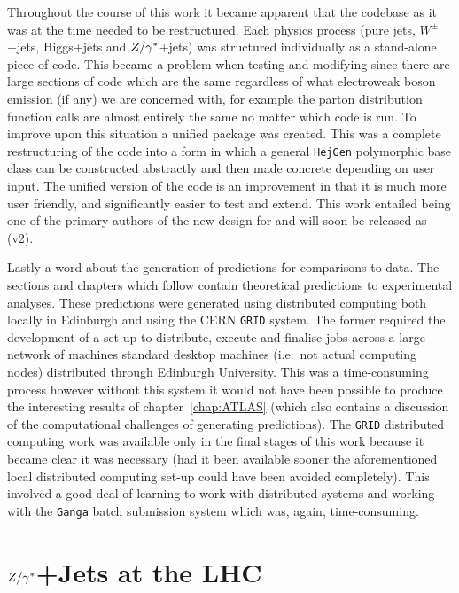 	Throughout the course of this work it became apparent that the \hej
	codebase as it was at the time needed to be restructured.  Each physics
	process (pure jets, $W^\pm$+jets, Higgs+jets and $Z/\gamma^*$+jets) was structured
	individually as a stand-alone piece of code.  This became a problem when testing
	and modifying \HEJ since there are large sections of code which are the same
	regardless of what electroweak boson emission (if any) we are concerned with,
	for example the parton distribution function calls are almost entirely the same
	no matter which code is run.  To improve upon this situation a unified \HEJ
	package was created.  This was a complete restructuring of the code into a form
	in which a general \texttt{HejGen} polymorphic base class can be
	constructed abstractly and then made concrete depending on user input.
	The unified version of the code is an improvement in that it is much more user
	friendly, and significantly easier to test and extend.  This work entailed
	being one of the primary authors of the new design for \hej and will soon be
	released as \HEJ (v2).

	Lastly a word about the generation of \hej predictions for comparisons to data.
	The sections and chapters which follow contain theoretical predictions to
	experimental analyses.  These predictions were generated using distributed
	computing both locally in Edinburgh and using the CERN \texttt{GRID} system.
	The former required the development of a set-up to distribute, execute and
	finalise jobs across a large network of machines standard desktop machines (i.e.~not
	actual computing nodes) distributed through Edinburgh University.  This was
	a time-consuming process however without this system it would not have been
	possible to produce the interesting results of chapter~\ref{chap:ATLAS} (which
	also contains a discussion of the computational challenges of generating \HEJA
	predictions). The \texttt{GRID} distributed computing work was available only in
	the final stages of this work because it became clear it was necessary (had it
	been available sooner the aforementioned local distributed computing set-up could
	have been avoided completely).  This involved a good deal of learning to work with
	distributed systems and working with the \texttt{Ganga} batch submission
	system which was, again, time-consuming.

\section{$Z/\gamma^*$+Jets at the LHC}

